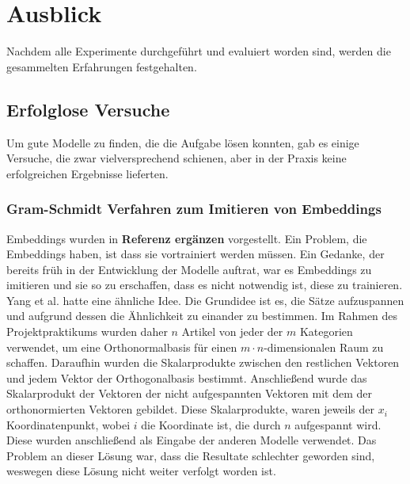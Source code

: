 \section{Ausblick}
\label{Ausblick}
Nachdem alle Experimente durchgeführt und evaluiert worden sind, werden die gesammelten Erfahrungen festgehalten.

\subsection{Erfolglose Versuche}
Um gute Modelle zu finden, die die Aufgabe lösen konnten, gab es einige Versuche, die zwar vielversprechend schienen, aber in der Praxis keine erfolgreichen Ergebnisse lieferten.

\subsubsection{Gram-Schmidt Verfahren zum Imitieren von Embeddings}
Embeddings wurden in \textbf{Referenz ergänzen} vorgestellt. Ein Problem, die Embeddings haben, ist dass sie vortrainiert werden müssen. Ein Gedanke, der bereits früh in der Entwicklung der Modelle auftrat, war es Embeddings zu imitieren und sie so zu erschaffen, dass es nicht notwendig ist, diese zu trainieren. Yang et al. \cite{Yang2019} hatte eine ähnliche Idee. Die Grundidee ist es, die Sätze aufzuspannen und aufgrund dessen die Ähnlichkeit zu einander zu bestimmen. Im Rahmen des Projektpraktikums wurden daher $n$ Artikel von jeder der $m$ Kategorien verwendet, um eine Orthonormalbasis für einen $m \cdot n$-dimensionalen Raum zu schaffen. Daraufhin wurden die Skalarprodukte zwischen den restlichen Vektoren und jedem Vektor der Orthogonalbasis bestimmt. Anschließend wurde das Skalarprodukt der Vektoren der nicht aufgespannten Vektoren mit dem der orthonormierten Vektoren gebildet. Diese Skalarprodukte, waren jeweils der $x_i$ Koordinatenpunkt, wobei $i$ die Koordinate ist, die durch $n$ aufgespannt wird. Diese wurden anschließend als Eingabe der anderen Modelle verwendet. Das Problem an dieser Lösung war, dass die Resultate schlechter geworden sind, weswegen diese Lösung nicht weiter verfolgt worden ist.

